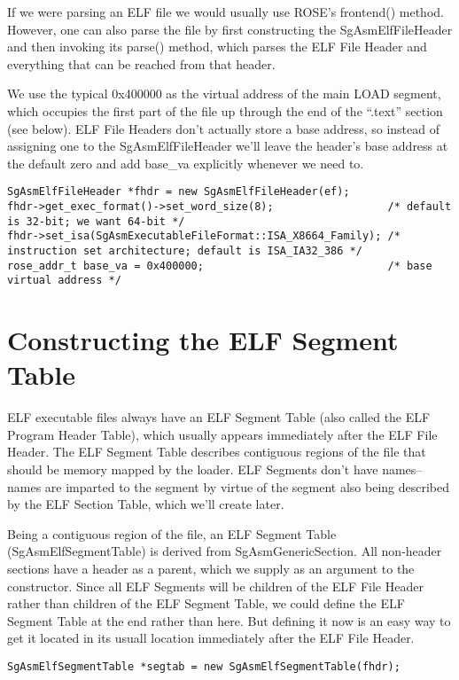 If we were parsing an ELF file we would usually use ROSE's frontend()
method. However, one can also parse the file by first constructing the
SgAsmElfFileHeader and then invoking its parse() method, which parses
the ELF File Header and everything that can be reached from that
header.

We use the typical 0x400000 as the virtual address of the main LOAD
segment, which occupies the first part of the file up through the end
of the ``.text'' section (see below). ELF File Headers don't actually
store a base address, so instead of assigning one to the
SgAsmElfFileHeader we'll leave the header's base address at the
default zero and add base\_va explicitly whenever we need to.

\begin{verbatim}
SgAsmElfFileHeader *fhdr = new SgAsmElfFileHeader(ef);
fhdr->get_exec_format()->set_word_size(8);                  /* default is 32-bit; we want 64-bit */
fhdr->set_isa(SgAsmExecutableFileFormat::ISA_X8664_Family); /* instruction set architecture; default is ISA_IA32_386 */
rose_addr_t base_va = 0x400000;                             /* base virtual address */
\end{verbatim}

\section{Constructing the ELF Segment Table}

ELF executable files always have an ELF Segment Table (also called the
ELF Program Header Table), which usually appears immediately after the
ELF File Header. The ELF Segment Table describes contiguous regions of
the file that should be memory mapped by the loader. ELF Segments
don't have names--names are imparted to the segment by virtue of the
segment also being described by the ELF Section Table, which we'll
create later.

Being a contiguous region of the file, an ELF Segment Table
(SgAsmElfSegmentTable) is derived from SgAsmGenericSection. All
non-header sections have a header as a parent, which we supply as an
argument to the constructor. Since all ELF Segments will be children of
the ELF File Header rather than children of the ELF Segment Table, we
could define the ELF Segment Table at the end rather than here. But
defining it now is an easy way to get it located in its usuall
location immediately after the ELF File Header.

\begin{verbatim}
SgAsmElfSegmentTable *segtab = new SgAsmElfSegmentTable(fhdr);
\end{verbatim}

